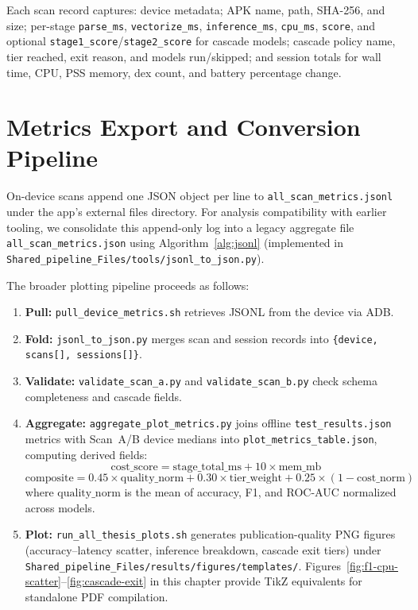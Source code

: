 Each scan record captures: device metadata; APK name, path, SHA-256, and size; per-stage \texttt{parse\_ms}, \texttt{vectorize\_ms}, \texttt{inference\_ms}, \texttt{cpu\_ms}, \texttt{score}, and optional \texttt{stage1\_score}/\texttt{stage2\_score} for cascade models; cascade policy name, tier reached, exit reason, and models run/skipped; and session totals for wall time, CPU, PSS memory, dex count, and battery percentage change.

\section{Metrics Export and Conversion Pipeline}
\label{sec:metrics-pipeline}

On-device scans append one JSON object per line to \texttt{all\_scan\_metrics.jsonl} under the app's external files directory. For analysis compatibility with earlier tooling, we consolidate this append-only log into a legacy aggregate file \texttt{all\_scan\_metrics.json} using Algorithm~\ref{alg:jsonl} (implemented in \texttt{Shared\_pipeline\_Files/tools/jsonl\_to\_json.py}).

The broader plotting pipeline proceeds as follows:
\begin{enumerate}
 \item \textbf{Pull:} \texttt{pull\_device\_metrics.sh} retrieves JSONL from the device via ADB.
 \item \textbf{Fold:} \texttt{jsonl\_to\_json.py} merges scan and session records into \texttt{\{device, scans[], sessions[]\}}.
 \item \textbf{Validate:} \texttt{validate\_scan\_a.py} and \texttt{validate\_scan\_b.py} check schema completeness and cascade fields.
 \item \textbf{Aggregate:} \texttt{aggregate\_plot\_metrics.py} joins offline \texttt{test\_results.json} metrics with Scan~A/B device medians into \texttt{plot\_metrics\_table.json}, computing derived fields:
   \begin{equation}
     \mathrm{cost\_score} = \mathrm{stage\_total\_ms} + 10 \times \mathrm{mem\_mb}
   \end{equation}
   \begin{equation}
     \mathrm{composite} = 0.45 \times \mathrm{quality\_norm} + 0.30 \times \mathrm{tier\_weight} + 0.25 \times (1 - \mathrm{cost\_norm})
   \end{equation}
   where $\mathrm{quality\_norm}$ is the mean of accuracy, F1, and ROC-AUC normalized across models.
 \item \textbf{Plot:} \texttt{run\_all\_thesis\_plots.sh} generates publication-quality PNG figures (accuracy--latency scatter, inference breakdown, cascade exit tiers) under \texttt{Shared\_pipeline\_Files/results/figures/templates/}. Figures~\ref{fig:f1-cpu-scatter}--\ref{fig:cascade-exit} in this chapter provide TikZ equivalents for standalone PDF compilation.
\end{enumerate}

